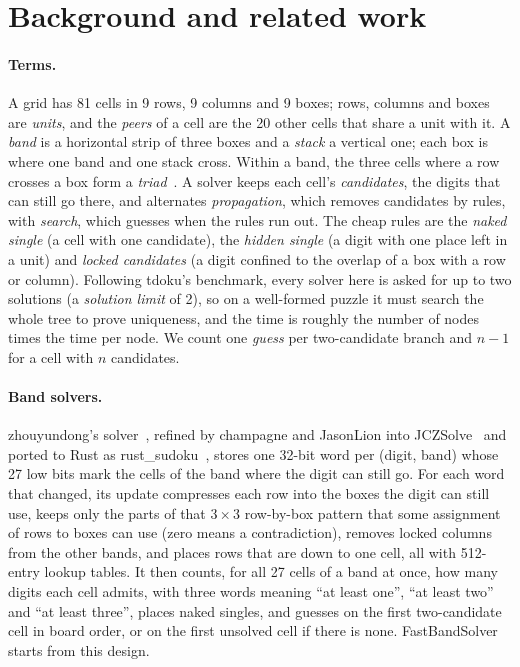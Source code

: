 \documentclass[11pt]{article}
\theoremstyle{definition}
\theoremstyle{plain}
\begin{document}
\section{Background and related work}
\label{sec:related}

\paragraph{Terms.} A grid has 81 cells in 9 rows, 9 columns and 9 boxes; rows, columns and boxes are \emph{units},
and the \emph{peers} of a cell are the 20 other cells that share a unit with it. A \emph{band} is a horizontal strip of
three boxes and a \emph{stack} a vertical one; each box is where one band and one stack cross. Within a band, the three
cells where a row crosses a box form a \emph{triad}~\cite{dillon2019nerdsniped}. A solver keeps each cell's
\emph{candidates}, the digits that can still go there, and alternates \emph{propagation}, which removes candidates by
rules, with \emph{search}, which guesses when the rules run out. The cheap rules are the \emph{naked single} (a cell
with one candidate), the \emph{hidden single} (a digit with one place left in a unit) and \emph{locked candidates}
(a digit confined to the overlap of a box with a row or column). Following tdoku's benchmark, every solver here is
asked for up to two solutions (a \emph{solution limit} of 2), so on a well-formed puzzle it must search the whole tree
to prove uniqueness, and the time is roughly the number of nodes times the time per node. We count one \emph{guess}
per two-candidate branch and $n-1$ for a cell with $n$ candidates.

\paragraph{Band solvers.} zhouyundong's solver~\cite{zhouyundong2012solver}, refined by champagne and JasonLion into
JCZSolve~\cite{jczsolve2016} and ported to Rust as rust\_sudoku~\cite{emerentius2018sudoku}, stores one 32-bit word per
(digit, band) whose 27 low bits mark the cells of the band where the digit can still go. For each word that changed,
its update compresses each row into the boxes the digit can still use, keeps only the parts of that $3\times 3$
row-by-box pattern that some assignment of rows to boxes can use (zero means a contradiction), removes locked columns
from the other bands, and places rows that are down to one cell, all with 512-entry lookup tables. It then counts, for
all 27 cells of a band at once, how many digits each cell admits, with three words meaning ``at least one'', ``at least
two'' and ``at least three'', places naked singles, and guesses on the first two-candidate cell in board order, or on
the first unsolved cell if there is none. FastBandSolver starts from this design.
\end{document}
